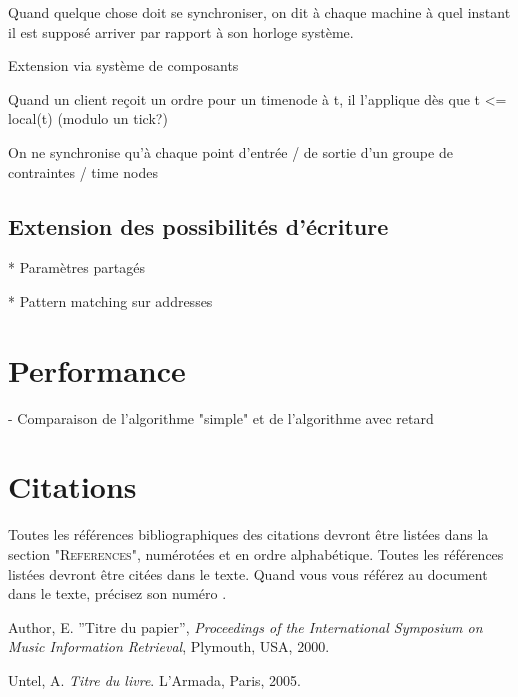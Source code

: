\documentclass{article}
\begin{document}
Quand quelque chose doit se synchroniser, on dit à chaque machine à quel instant il est supposé arriver par rapport à son horloge système.

Extension via système de composants

Quand un client reçoit un ordre pour un timenode à t, il l'applique dès que t <= local(t) (modulo un tick?)

On ne synchronise qu'à chaque point d'entrée / de sortie d'un groupe de contraintes / time nodes
\subsection{Extension des possibilités d'écriture}
* Paramètres partagés

* Pattern matching sur addresses 

\section{Performance}
- Comparaison de l'algorithme "simple" et de l'algorithme avec retard

\section{Citations}

Toutes les références bibliographiques des citations devront être listées dans la section "\textsc{References}", numérotées et en ordre alphabétique. Toutes les références  listées devront être citées dans le texte. Quand  vous vous référez au document dans le texte, précisez son numéro \cite{Author:00}.

\begin{thebibliography}{2}

 Author, E.
''Titre du papier'',
{\it Proceedings of the International Symposium on Music Information
Retrieval}, Plymouth, USA, 2000.

 Untel, A.
{\it  Titre du livre}.
L'Armada, Paris, 2005.

\end{thebibliography}
\end{document}
